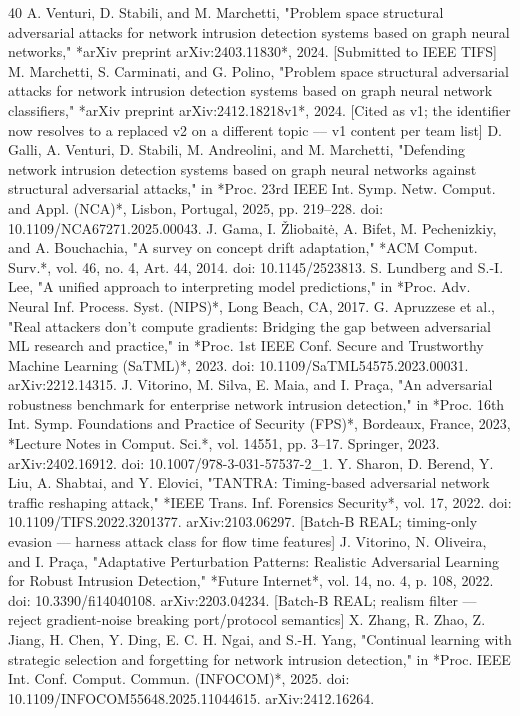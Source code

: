 \begin{thebibliography}{40}
 A. Venturi, D. Stabili, and M. Marchetti, "Problem space structural adversarial attacks for network intrusion detection systems based on graph neural networks," *arXiv preprint arXiv:2403.11830*, 2024. [Submitted to IEEE TIFS]
 M. Marchetti, S. Carminati, and G. Polino, "Problem space structural adversarial attacks for network intrusion detection systems based on graph neural network classifiers," *arXiv preprint arXiv:2412.18218v1*, 2024. [Cited as v1; the identifier now resolves to a replaced v2 on a different topic — v1 content per team list]
 D. Galli, A. Venturi, D. Stabili, M. Andreolini, and M. Marchetti, "Defending network intrusion detection systems based on graph neural networks against structural adversarial attacks," in *Proc. 23rd IEEE Int. Symp. Netw. Comput. and Appl. (NCA)*, Lisbon, Portugal, 2025, pp. 219–228. doi: 10.1109/NCA67271.2025.00043.
 J. Gama, I. Žliobaitė, A. Bifet, M. Pechenizkiy, and A. Bouchachia, "A survey on concept drift adaptation," *ACM Comput. Surv.*, vol. 46, no. 4, Art. 44, 2014. doi: 10.1145/2523813.
 S. Lundberg and S.-I. Lee, "A unified approach to interpreting model predictions," in *Proc. Adv. Neural Inf. Process. Syst. (NIPS)*, Long Beach, CA, 2017.
 G. Apruzzese et al., "Real attackers don't compute gradients: Bridging the gap between adversarial ML research and practice," in *Proc. 1st IEEE Conf. Secure and Trustworthy Machine Learning (SaTML)*, 2023. doi: 10.1109/SaTML54575.2023.00031. arXiv:2212.14315.
 J. Vitorino, M. Silva, E. Maia, and I. Praça, "An adversarial robustness benchmark for enterprise network intrusion detection," in *Proc. 16th Int. Symp. Foundations and Practice of Security (FPS)*, Bordeaux, France, 2023, *Lecture Notes in Comput. Sci.*, vol. 14551, pp. 3–17. Springer, 2023. arXiv:2402.16912. doi: 10.1007/978-3-031-57537-2\_1.
 Y. Sharon, D. Berend, Y. Liu, A. Shabtai, and Y. Elovici, "TANTRA: Timing-based adversarial network traffic reshaping attack," *IEEE Trans. Inf. Forensics Security*, vol. 17, 2022. doi: 10.1109/TIFS.2022.3201377. arXiv:2103.06297. [Batch-B REAL; timing-only evasion — harness attack class for flow time features]
 J. Vitorino, N. Oliveira, and I. Praça, "Adaptative Perturbation Patterns: Realistic Adversarial Learning for Robust Intrusion Detection," *Future Internet*, vol. 14, no. 4, p. 108, 2022. doi: 10.3390/fi14040108. arXiv:2203.04234. [Batch-B REAL; realism filter — reject gradient-noise breaking port/protocol semantics]
 X. Zhang, R. Zhao, Z. Jiang, H. Chen, Y. Ding, E. C. H. Ngai, and S.-H. Yang, "Continual learning with strategic selection and forgetting for network intrusion detection," in *Proc. IEEE Int. Conf. Comput. Commun. (INFOCOM)*, 2025. doi: 10.1109/INFOCOM55648.2025.11044615. arXiv:2412.16264.

\end{thebibliography}
